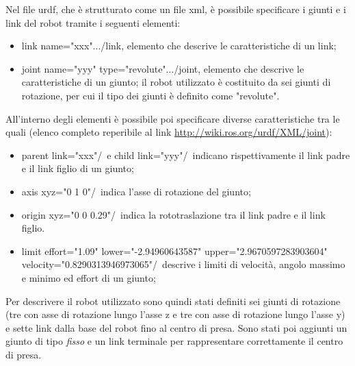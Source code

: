 Nel file urdf, che è strutturato come un file xml, è possibile specificare i giunti e i link del robot tramite i seguenti elementi:
\begin{itemize}
	\item \tl link name="xxx"\tr...\tl /link\tr, elemento che descrive le caratteristiche di un link;
	\item \tl joint name="yyy" type="revolute"\tr...\tl /joint\tr, elemento che descrive le caratteristiche di un giunto; il robot utilizzato è costituito da sei giunti di rotazione, per cui il tipo dei giunti è definito come "revolute".
\end{itemize}
All'interno degli elementi è possibile poi specificare diverse caratteristiche tra le quali (elenco completo reperibile al link \url{http://wiki.ros.org/urdf/XML/joint}):
\begin{itemize}
	\item  \tl parent link="xxx"/\tr\ e \tl child link="yyy"/\tr\ indicano rispettivamente il link padre e il link figlio di un giunto;
	\item \tl axis xyz="0 1 0"/\tr\ indica l'asse di rotazione del giunto;
	\item  \tl origin xyz="0 0 0.29"/\tr\ indica la rototraslazione tra il link padre e il link figlio.
	\item \tl limit effort="1.09" lower="-2.94960643587" upper="2.9670597283903604" velocity="0.8290313946973065"/\tr \ descrive i limiti di velocità, angolo massimo e minimo ed effort di un giunto;
\end{itemize}
Per descrivere il robot utilizzato sono quindi stati definiti sei giunti di rotazione (tre con asse di rotazione lungo l'asse z e tre con asse di rotazione lungo l'asse y) e sette link dalla base del robot fino al centro di presa. Sono stati poi aggiunti un giunto di tipo \textit{fisso} e un link terminale per rappresentare correttamente il centro di presa.

\clearpage

